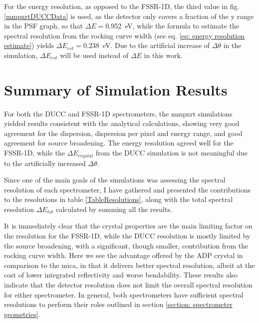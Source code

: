 For the energy resolution, as opposed to the FSSR-1D, 
the third value in fig. \ref{mmpxrtDUCCData} is used, 
as the detector only covers a fraction of the y range 
in the PSF graph, so that $\Delta E = 
$\SI{0.952}{\electronvolt}, while the formula to 
estimate the spectral resolution from the rocking 
curve width (see eq. \ref{eq: energy resolution 
estimate}) yields $\Delta E_{est} = 
$\SI{0.238}{\electronvolt}. Due to the artificial 
increase of $\Delta\theta$ in the simulation, $\Delta 
E_{est}$ will be used instead of $\Delta E$ in this 
work.


\section{Summary of Simulation Results}
\label{section: simulation results}
For both the DUCC and FSSR-1D spectrometers, the mmpxrt 
simulations yielded 
results consistent with the analytical calculations, 
showing very good 
agreement for the 
dispersion, dispersion per pixel and energy range, 
and good agreement for source broadening. The 
energy resolution agreed well for the FSSR-1D, while 
the $\Delta E_{crystal}$ from the DUCC simulation is 
not 
meaningful due to the artificially increased 
$\Delta\theta$.

Since one of the main goals of the simulations was assessing the 
spectral 
resolution of each spectrometer, I have gathered and presented 
the 
contributions to the resolutions in table 
\ref{TableResolutions}, along with the total spectral 
resolution $\Delta E_{tot}$ calculated by summing all 
the results. 

It is immediately clear that the crystal properties 
are the main limiting factor on the resolution for 
the FSSR-1D, while the DUCC resolution is mostly 
limited 
by the source broadening, with a significant, though 
smaller, contribution from the rocking curve width. 
Here we see the advantage offered by the ADP crystal 
in comparison to the mica, in that it delivers better 
spectral resolution, albeit at the cost of lower 
integrated reflectivity and worse bendability. These 
results also indicate that the detector 
resolution does not limit the overall spectral 
resolution for either spectrometer. In general, both 
spectrometers have sufficient 
spectral resolutions to perform their roles outlined 
in section \ref{section: spectrometer geometries}.

